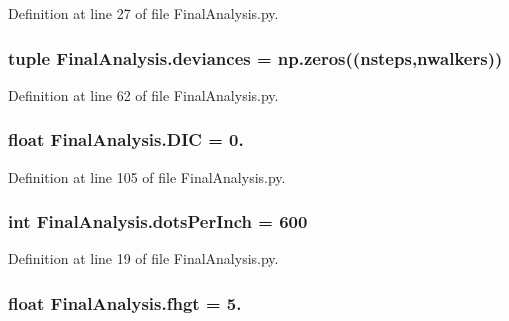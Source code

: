 Definition at line 27 of file Final\-Analysis.\-py.

\hypertarget{namespace_final_analysis_a3df48ee06c31fdb1cf340b4fbcf9f9f6}{
\subsubsection[{deviances}]{\setlength{\rightskip}{0pt plus 5cm}tuple Final\-Analysis.\-deviances = np.\-zeros(({\bf nsteps},{\bf nwalkers}))}}\label{namespace_final_analysis_a3df48ee06c31fdb1cf340b4fbcf9f9f6}


Definition at line 62 of file Final\-Analysis.\-py.

\hypertarget{namespace_final_analysis_a68c248ca9c873f73a8e36a8ee251cb55}{
\subsubsection[{D\-I\-C}]{\setlength{\rightskip}{0pt plus 5cm}float Final\-Analysis.\-D\-I\-C = 0.}}\label{namespace_final_analysis_a68c248ca9c873f73a8e36a8ee251cb55}


Definition at line 105 of file Final\-Analysis.\-py.

\hypertarget{namespace_final_analysis_ae1013699910a86a41a0a50eeba068419}{
\subsubsection[{dots\-Per\-Inch}]{\setlength{\rightskip}{0pt plus 5cm}int Final\-Analysis.\-dots\-Per\-Inch = 600}}\label{namespace_final_analysis_ae1013699910a86a41a0a50eeba068419}


Definition at line 19 of file Final\-Analysis.\-py.

\hypertarget{namespace_final_analysis_a655a72c0122ba74cfe825ce4a0fd48e0}{
\subsubsection[{fhgt}]{\setlength{\rightskip}{0pt plus 5cm}float Final\-Analysis.\-fhgt = 5.}}\label{namespace_final_analysis_a655a72c0122ba74cfe825ce4a0fd48e0}


